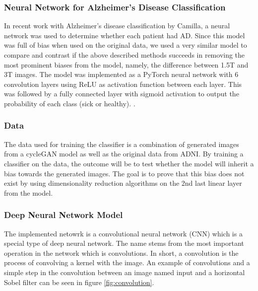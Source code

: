 \documentclass[12pt, fleqn, titlepage]{article}
\begin{document}
\subsubsection{Neural Network for Alzheimer's Disease Classification} \label{camillas_model}
In recent work with Alzheimer's disease classification by Camilla, a neural network was used to determine whether each patient had AD. Since this model was full of bias when used on the original data, we used a very similar model to compare and contrast if the above described methods succeeds in removing the most prominent biases from the model, namely, the difference between 1.5T and 3T images. The model was implemented as a PyTorch neural network with 6 convolution layers using ReLU as activation function between each layer. This was followed by a fully connected layer with sigmoid activation to output the probability of each class (sick or healthy).  \cite{CamillaKandidat}.

\subsubsection{Data}
The data used for training the classifier is a combination of generated images from a cycleGAN model as well as the original data from ADNI. By training a classifier on the data, the outcome will be to test whether the model will inherit a bias towards the generated images. The goal is to prove that this bias does not exist by using dimensionality reduction algorithms on the 2nd last linear layer from the model. 

\subsubsection{Deep Neural Network Model}

	The implemented netowrk is a convolutional neural network (CNN) which is a special type of deep neural network. The name stems from the most important operation in the network which is convolutions. In short, a convolution is the process of convolving a kernel with the image. An example of convolutions and a simple step in the convolution between an image named input and a horizontal Sobel filter can be seen in figure \ref{fig:convolution}.
	
\end{document}
